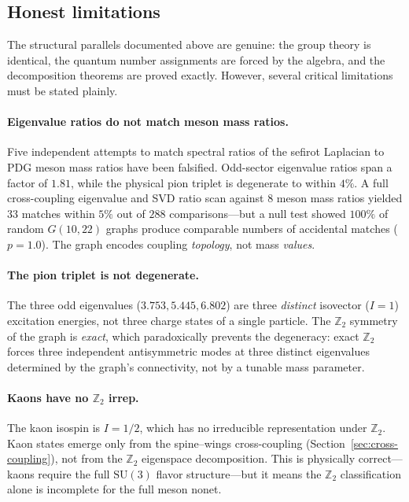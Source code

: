 \documentclass[11pt,a4paper]{amsart}
\theoremstyle{remark}
\newcommand{\bbZ}{\mathbb{Z}}
\begin{document}
\subsection{Honest limitations}
\label{sec:meson-limits}

The structural parallels documented above are genuine: the group theory is
identical, the quantum number assignments are forced by the algebra, and
the decomposition theorems are proved exactly. However, several critical
limitations must be stated plainly.

\paragraph{Eigenvalue ratios do not match meson mass ratios.}
Five independent attempts to match spectral ratios of the sefirot Laplacian
to PDG meson mass ratios have been falsified. Odd-sector eigenvalue ratios
span a factor of $1.81$, while the physical pion triplet is degenerate to
within $4\%$. A full cross-coupling eigenvalue and SVD ratio scan against
$8$ meson mass ratios yielded $33$ matches within $5\%$ out of $288$
comparisons---but a null test showed $100\%$ of random $G(10, 22)$ graphs
produce comparable numbers of accidental matches ($p = 1.0$). The graph
encodes coupling \emph{topology}, not mass \emph{values}.

\paragraph{The pion triplet is not degenerate.}
The three odd eigenvalues ($3.753, 5.445, 6.802$) are three \emph{distinct}
isovector ($I = 1$) excitation energies, not three charge states of a
single particle. The $\bbZ_2$ symmetry of the graph is \emph{exact}, which
paradoxically prevents the degeneracy: exact $\bbZ_2$ forces three
independent antisymmetric modes at three distinct eigenvalues determined
by the graph's connectivity, not by a tunable mass parameter.

\paragraph{Kaons have no $\bbZ_2$ irrep.}
The kaon isospin is $I = 1/2$, which has no irreducible representation under
$\bbZ_2$. Kaon states emerge only from the spine--wings cross-coupling
(Section~\ref{sec:cross-coupling}), not from the $\bbZ_2$ eigenspace
decomposition. This is physically correct---kaons require the full
$\mathrm{SU}(3)$ flavor structure---but it means the $\bbZ_2$ classification
alone is incomplete for the full meson nonet.
\end{document}
